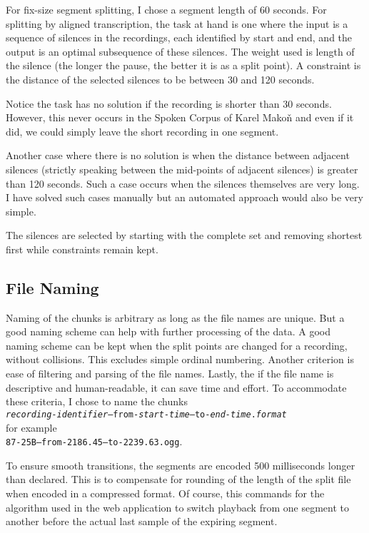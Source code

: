 \documentclass[runningheads]{llncs}
\begin{document}
For fix-size segment splitting, I chose a segment length of 60 seconds. For
splitting by aligned transcription, the task at hand is one where the input is a
sequence of silences in the recordings, each identified by start and end, and
the output is an optimal subsequence of these silences. The weight used is
length of the silence (the longer the pause, the better it is as a split point).
A constraint is the distance of the selected silences to be between 30 and 120
seconds.

Notice the task has no solution if the recording is shorter than 30 seconds.
However, this never occurs in the Spoken Corpus of Karel Makoň and even if it
did, we could simply leave the short recording in one segment.

Another case where there is no solution is when the distance between adjacent
silences (strictly speaking between the mid-points of adjacent silences) is
greater than 120 seconds. Such a case occurs when the silences themselves are
very long. I have solved such cases manually but an automated approach would
also be very simple.

The silences are selected by starting with the complete set and removing
shortest first while constraints remain kept.

\subsection{File Naming}

Naming of the chunks is arbitrary as long as the file names are unique. But a
good naming scheme can help with further processing of the data. A good naming
scheme can be kept when the split points are changed for a recording, without
collisions. This excludes simple ordinal numbering. Another criterion is ease of
filtering and parsing of the file names. Lastly, the if the file name is
descriptive and human-readable, it can save time and effort. To accommodate
these criteria, I chose to name the chunks \\
\texttt{{\em{}recording-identifier}--from-{\em{}start-time}--to-{\em{}end-time}.{\em{}format}} \\
for example \\
\texttt{87-25B--from-2186.45--to-2239.63.ogg}.

To ensure smooth transitions, the segments are encoded 500 milliseconds longer
than declared. This is to compensate for rounding of the length of the split
file when encoded in a compressed format. Of course, this commands for the
algorithm used in the web application to switch playback from one segment to
another before the actual last sample of the expiring segment.
\end{document}

